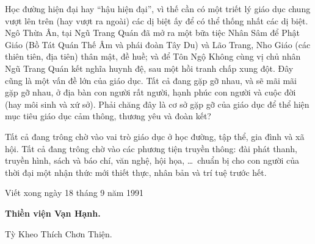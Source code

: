 Học đường hiện đại hay ``hậu hiện đại'', vì thế cần có một triết lý giáo dục chung vượt lên trên (hay vượt ra ngoài) các dị biệt ấy để có thể thống nhất các dị biệt. Ngô Thừa Ân, tại Ngũ Trang Quán đã mở ra một bữa tiệc Nhân Sâm để Phật Giáo (Bồ Tát Quán Thế Âm và phái đoàn Tây Du) và Lão Trang, Nho Giáo (các thiên tiên, địa tiên) thân mật, đề huề; và để Tôn Ngộ Không cùng vị chủ nhân Ngũ Trang Quán kết nghĩa huynh đệ, sau một hồi tranh chấp xung đột. Đây cũng là một vấn đề lớn của giáo dục. Tất cả đang gặp gỡ nhau, và sẽ mãi mãi gặp gỡ nhau, ở địa bàn con người rất người, hạnh phúc con người và cuộc đời (hay môi sinh và xứ sở). Phải chăng đây là cơ sở gặp gỡ của giáo dục để thể hiện mục tiêu giáo dục cảm thông, thương yêu và đoàn kết?

Tất cả đang trông chờ vào vai trò giáo dục ở học đường, tập thể, gia đình và xã hội. Tất cả đang trông chờ vào các phương tiện truyền thông: đài phát thanh, truyền hình, sách và báo chí, văn nghệ, hội họa, \ldots ~chuẩn bị cho con người của thời đại một nhận thức mới thiết thực, nhân bản và trí tuệ trước hết.


\hrulefill

\hfill
\begin{minipage}{0.6\textwidth}
    \begin{center}
Viết xong ngày 18 tháng 9 năm 1991

{\bf Thiền viện Vạn Hạnh.

Tỳ Kheo Thích Chơn Thiện.}
    \end{center}
\end{minipage}

